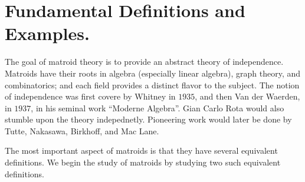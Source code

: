 
\chapter{Fundamental Definitions and Examples.} %

\label{chapter 1} %


The goal of matroid theory is to provide an abstract theory of independence.
Matroids have their roots in algebra (especially linear algebra), graph theory,
and combinatorics; and each field provides a distinct flavor to the subject. The
notion of independence was first covere by Whitney in $1935$, and then Van der
Waerden, in $1937$, in his seminal work ``Moderne Algebra''. Gian Carlo Rota
would also stumble upon the theory indepednetly. Pioneering work would later be
done by Tutte, Nakasawa, Birkhoff, and Mac Lane.

The most important aspect of matroids is that they have several
equivalent definitions. We begin the study of matroids by studying two
such equivalent definitions.


%
%
%
%
%
%
%
